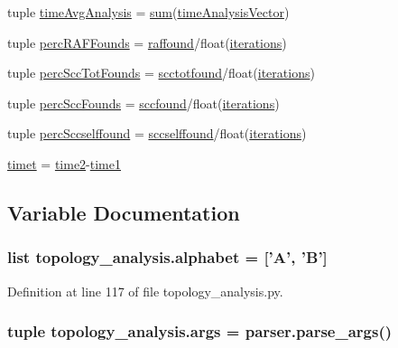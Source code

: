 \begin{DoxyCompactItemize}
tuple \hyperlink{a00159_a0689e49982e7bedba8ac4eb5534963db}{time\+Avg\+Analysis} = \hyperlink{a00106_a59a869fb2b28d56dacd91c09e1dffc8d}{sum}(\hyperlink{a00159_a3ddbda333425be797470f7d058e2c8a4}{time\+Analysis\+Vector})
\item 
tuple \hyperlink{a00159_a51a66ce80f70aeab8bde70af9960e419}{perc\+R\+A\+F\+Founds} = \hyperlink{a00159_ad625a009a3da81a04b490e62975ecf39}{raffound}/float(\hyperlink{a00159_a2117e01e4647cbdecc0ece27cec1cff4}{iterations})
\item 
tuple \hyperlink{a00159_aee49954a6b9abb7c4bd677c17ed4013b}{perc\+Scc\+Tot\+Founds} = \hyperlink{a00159_ac05c0aaedb357a42df2d5f3915bbedfa}{scctotfound}/float(\hyperlink{a00159_a2117e01e4647cbdecc0ece27cec1cff4}{iterations})
\item 
tuple \hyperlink{a00159_a14f23c89de77042b80e78e1d9ab7b754}{perc\+Scc\+Founds} = \hyperlink{a00159_aa8258ef828502be89350332ae97a0d3a}{sccfound}/float(\hyperlink{a00159_a2117e01e4647cbdecc0ece27cec1cff4}{iterations})
\item 
tuple \hyperlink{a00159_a8bf55c62b8e7385526396a9003e343bb}{perc\+Sccselffound} = \hyperlink{a00159_aeacefe088f3283ea0e80ee31c0486d6d}{sccselffound}/float(\hyperlink{a00159_a2117e01e4647cbdecc0ece27cec1cff4}{iterations})
\item 
\hyperlink{a00159_a5b12bbbc66679be171ab082dbaeba90b}{timet} = \hyperlink{a00159_a44666efa43bfc08ab8305c8d325f7456}{time2}-\/\hyperlink{a00159_ac7160059dec8067db4645fa39feec359}{time1}
\end{DoxyCompactItemize}


\subsection{Variable Documentation}
\hypertarget{a00159_ab0d9c13eee214bf78b20760bf2835248}{
\subsubsection[{alphabet}]{\setlength{\rightskip}{0pt plus 5cm}list topology\+\_\+analysis.\+alphabet = \mbox{[}'{\bf A}', '{\bf B}'\mbox{]}}}\label{a00159_ab0d9c13eee214bf78b20760bf2835248}


Definition at line 117 of file topology\+\_\+analysis.\+py.

\hypertarget{a00159_a6741aa05e3fb94565993dd2001401e98}{
\subsubsection[{args}]{\setlength{\rightskip}{0pt plus 5cm}tuple topology\+\_\+analysis.\+args = parser.\+parse\+\_\+args()}}\label{a00159_a6741aa05e3fb94565993dd2001401e98}


